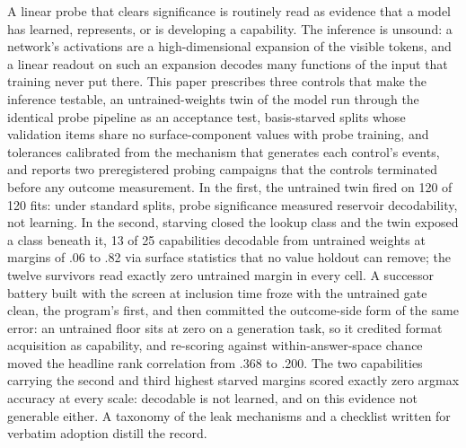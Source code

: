 A linear probe that clears significance is routinely read as evidence
that a model has learned, represents, or is developing a capability.
The inference is unsound: a network's activations are a
high-dimensional expansion of the visible tokens, and a linear readout
on such an expansion decodes many functions of the input that training
never put there. This paper prescribes three controls that make the
inference testable, an untrained-weights twin of the model run through
the identical probe pipeline as an acceptance test, basis-starved
splits whose validation items share no surface-component values with
probe training, and tolerances calibrated from the mechanism that
generates each control's events, and reports two preregistered probing
campaigns that the controls terminated before any outcome measurement.
In the first, the untrained twin fired on 120 of 120 fits: under
standard splits, probe significance measured reservoir decodability,
not learning. In the second, starving closed the lookup class and the
twin exposed a class beneath it, 13 of 25 capabilities decodable from
untrained weights at margins of .06 to .82 via surface statistics that
no value holdout can remove; the twelve survivors read exactly zero
untrained margin in every cell. A successor battery built with the
screen at inclusion time froze with the untrained gate clean, the
program's first, and then committed the outcome-side form of the same
error: an untrained floor sits at zero on a generation task, so it
credited format acquisition as capability, and re-scoring against
within-answer-space chance moved the headline rank correlation from
.368 to .200. The two capabilities carrying the second and third
highest starved margins scored exactly zero argmax accuracy at every
scale: decodable is not learned, and on this evidence not generable
either. A taxonomy of the leak mechanisms and a checklist written for
verbatim adoption distill the record.
